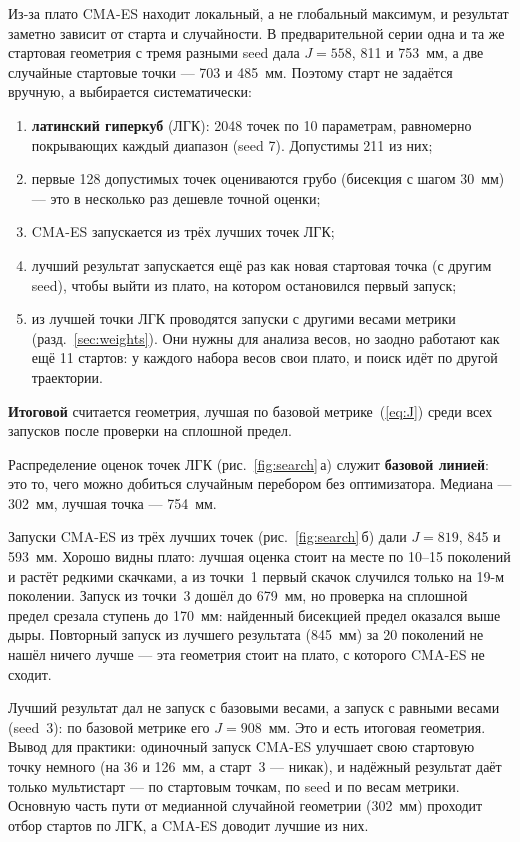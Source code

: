 \documentclass[11pt,a4paper]{article}
\begin{document}
Из-за плато CMA-ES находит локальный, а не глобальный максимум, и результат заметно зависит
от старта и случайности. В предварительной серии одна и та же стартовая геометрия с тремя
разными seed дала $J=558$, 811 и 753~мм, а две случайные стартовые точки --- 703 и 485~мм.
Поэтому старт не задаётся вручную, а выбирается систематически:
\begin{enumerate}
  \item \textbf{латинский гиперкуб} (ЛГК): 2048 точек по 10 параметрам, равномерно покрывающих
        каждый диапазон (seed 7). Допустимы 211 из них;
  \item первые 128 допустимых точек оцениваются грубо (бисекция с шагом 30~мм) --- это в несколько
        раз дешевле точной оценки;
  \item CMA-ES запускается из трёх лучших точек ЛГК;
  \item лучший результат запускается ещё раз как новая стартовая точка (с другим seed),
        чтобы выйти из плато, на котором остановился первый запуск;
  \item из лучшей точки ЛГК проводятся запуски с другими весами метрики (разд.~\ref{sec:weights}).
        Они нужны для анализа весов, но заодно работают как ещё 11 стартов: у каждого набора
        весов свои плато, и поиск идёт по другой траектории.
\end{enumerate}
\textbf{Итоговой} считается геометрия, лучшая по базовой метрике~(\ref{eq:J}) среди всех
запусков после проверки на сплошной предел.

Распределение оценок точек ЛГК (рис.~\ref{fig:search}\,а) служит \textbf{базовой линией}:
это то, чего можно добиться случайным перебором без оптимизатора. Медиана --- 302~мм,
лучшая точка --- 754~мм.

Запуски CMA-ES из трёх лучших точек (рис.~\ref{fig:search}\,б) дали $J=819$, 845 и 593~мм.
Хорошо видны плато: лучшая оценка стоит на месте по 10--15 поколений и растёт редкими скачками,
а из точки~1 первый скачок случился только на 19-м поколении. Запуск из точки~3 дошёл до 679~мм,
но проверка на сплошной предел срезала ступень до 170~мм: найденный бисекцией предел оказался
выше дыры. Повторный запуск из лучшего результата (845~мм) за 20 поколений не нашёл ничего
лучше --- эта геометрия стоит на плато, с которого CMA-ES не сходит.

Лучший результат дал не запуск с базовыми весами, а запуск с равными весами (seed~3):
по базовой метрике его $J=908$~мм. Это и есть итоговая геометрия. Вывод для практики:
одиночный запуск CMA-ES улучшает свою стартовую точку немного (на 36 и 126~мм, а старт~3 ---
никак), и надёжный результат даёт только мультистарт --- по стартовым точкам, по seed
и по весам метрики. Основную часть пути от медианной случайной геометрии (302~мм)
проходит отбор стартов по ЛГК, а CMA-ES доводит лучшие из них.
\end{document}

